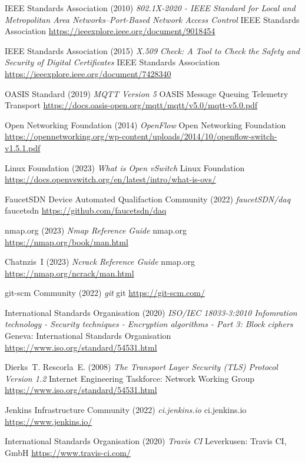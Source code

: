 \documentclass[11pt, oneside]{book}   	%
\begin{document}
\begin{thebibliography}{99}
 IEEE Standards Association (2010)
\emph{802.1X-2020 - IEEE Standard for Local and Metropolitan Area Networks--Port-Based Network Access Control}
IEEE Standards Association
\url{https://ieeexplore.ieee.org/document/9018454}

 IEEE Standards Association (2015)
\emph{X.509 Check: A Tool to Check the Safety and Security of Digital Certificates}
IEEE Standards Association
\url{https://ieeexplore.ieee.org/document/7428340}

 OASIS Standard (2019)
\emph{MQTT Version 5}
OASIS Message Queuing Telemetry Transport 
\url{https://docs.oasis-open.org/mqtt/mqtt/v5.0/mqtt-v5.0.pdf}

 Open Networking Foundation (2014)
\emph{OpenFlow}
Open Networking Foundation
\url{https://opennetworking.org/wp-content/uploads/2014/10/openflow-switch-v1.5.1.pdf}

 Linux Foundation (2023)
\emph{What is Open vSwitch}
Linux Foundation 
\url{https://docs.openvswitch.org/en/latest/intro/what-is-ovs/}

 FaucetSDN Device Automated Qualifaction Community (2022)
\emph{faucetSDN/daq}
faucetsdn
\url{https://github.com/faucetsdn/daq}

 nmap.org (2023)
\emph{Nmap Reference Guide}
nmap.org
\url{https://nmap.org/book/man.html}

 Chatnzis~I (2023)
\emph{Ncrack Reference Guide}
nmap.org
\url{https://nmap.org/ncrack/man.html}

 git-scm Community (2022)
\emph{git}
git
\url{https://git-scm.com/}

 International Standards Organisation (2020)
\emph{ISO/IEC 18033-3:2010 Infomration technology - Security techniques - Encryption algorithms - Part 3: Block ciphers}
Geneva: International Standards Organisation
\url{https://www.iso.org/standard/54531.html}

 Dierks~T. Rescorla~E. (2008)
\emph{The Transport Layer Security (TLS) Protocol Version 1.2}
Internet Engineering Taskforce: Network Working Group
\url{https://www.iso.org/standard/54531.html}

 Jenkins Infrastructure Community (2022)
\emph{ci.jenkins.io}
ci.jenkins.io
\url{https://www.jenkins.io/}

 International Standards Organisation (2020)
\emph{Travis CI}
Leverkusen: Travis CI, GmbH
\url{https://www.travis-ci.com/}



\end{thebibliography}
\end{document}

